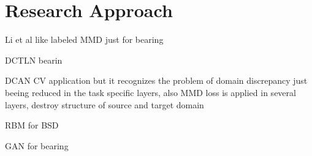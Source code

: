 \chapter{Research Approach}\label{chapter:research_approach}

Li et al \cite{Li2018} like labeled MMD just for bearing

DCTLN \cite{Guo2019} bearin 

DCAN CV application but it recognizes the problem of domain discrepancy just beeing reduced in the task specific layers, also MMD loss is applied in several layers, destroy structure of source and target domain

RBM for BSD

GAN for bearing

